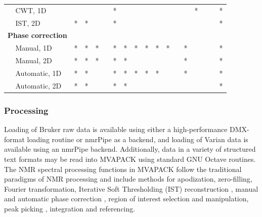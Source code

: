 \begin{table}[h!]
\begin{center}
\begin{tabular}{l l | l l l l l l l l l l l l l l l l}
  & CWT, 1D
  &   &   &   &   & * &   &   &   &   &   &   &   & * &   &   & * \\
  & IST, 2D
  & * & * &   &   & * &   &   &   &   &   &   &   &   &   &   & * \\
  \multicolumn{2}{l|}{{\bf Phase correction}} & & & & & & & & & & & & & & & & \\
  & Manual, 1D
  & * & * & * &   & * & * & * & * & * & * &   & * &   &   &   & * \\
  & Manual, 2D
  & * & * & * &   & * & * &   &   &   &   &   & * &   &   &   & * \\
  & Automatic, 1D
  & * & * &   &   & * & * & * & * & * &   &   & * &   &   &   & * \\
  & Automatic, 2D
  & * & * &   &   & * & * &   &   &   &   &   &   &   &   &   & *
\end{tabular}
\end{center}
\end{table}

\subsubsection{Processing}

\begin{doublespace}
Loading of Bruker raw data is available using either a high-performance
DMX-format loading routine or nmrPipe \cite{delaglio:jbnmr1995} as a backend,
and loading of Varian data is available using an nmrPipe backend. Additionally,
data in a variety of structured text formats may be read into MVAPACK using
standard GNU Octave routines. The NMR spectral processing functions in MVAPACK
follow the traditional paradigms of NMR processing \cite{hoch1996} and include
methods for apodization, zero-filling, Fourier transformation, Iterative Soft
Thresholding (IST) reconstruction \cite{hyberts:jacs2007}, manual and automatic
phase correction
\cite{siegel:aca1981,chen:jmr2002,balacco:mrc2009}, region of interest
selection and manipulation, peak picking \cite{du:binf2006}, integration and
referencing.
\end{doublespace}

